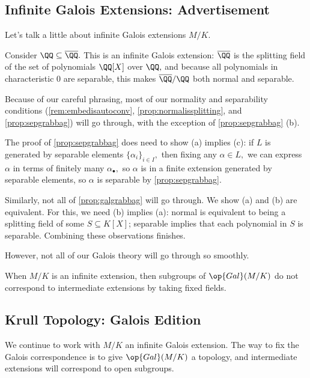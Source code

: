 \subsection{Infinite Galois Extensions: Advertisement}
Let's talk a little about infinite Galois extensions $M/K.$
\begin{example}
	Consider $\QQ\subseteq\overline\QQ.$ This is an infinite Galois extension: $\overline\QQ$ is the splitting field of the set of polynomials $\QQ[X]$ over $\QQ,$ and because all polynomials in characteristic $0$ are separable, this makes $\overline\QQ/\QQ$ both normal and separable.
\end{example}
\begin{remark}[Nir]
	Because of our careful phrasing, most of our normality and separability conditions (\autoref{rem:embedisautoconv}, \autoref{prop:normalissplitting}, and \autoref{prop:sepgrabbag}) will go through, with the exception of \autoref{prop:sepgrabbag} (b).
	
	The proof of \autoref{prop:sepgrabbag} does need to show (a) implies (c): if $L$ is generated by separable elements $\{\alpha_i\}_{i\in I},$ then fixing any $\alpha\in L,$ we can express $\alpha$ in terms of finitely many $\alpha_\bullet,$ so $\alpha$ is in a finite extension generated by separable elements, so $\alpha$ is separable by \autoref{prop:sepgrabbag}.
\end{remark}
\begin{remark}[Nir]
	Similarly, not all of \autoref{prop:galgrabbag} will go through. We show (a) and (b) are equivalent. For this, we need (b) implies (a): normal is equivalent to being a splitting field of some $S\subseteq K[X]$; separable implies that each polynomial in $S$ is separable. Combining these observations finishes.
\end{remark}
However, not all of our Galois theory will go through so smoothly.
\begin{warn}
	When $M/K$ is an infinite extension, then subgroups of $\op{Gal}(M/K)$ do not correspond to intermediate extensions by taking fixed fields.
\end{warn}

\subsection{Krull Topology: Galois Edition}
We continue to work with $M/K$ an infinite Galois extension. The way to fix the Galois correspondence is to give $\op{Gal}(M/K)$ a topology, and intermediate extensions will correspond to open subgroups.


